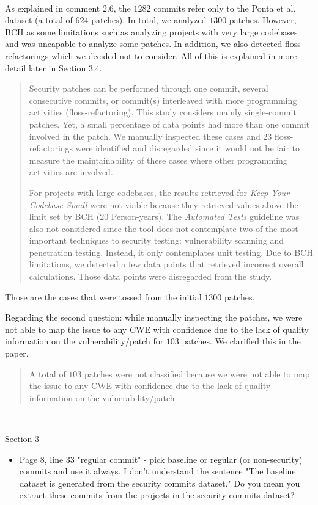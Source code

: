 \documentclass[11pt,fleqn]{article}
\newcommand{\eline}{\vspace*{.75\baselineskip}}
\newcommand{\Referee}[1]{\eline \noindent {\bf Reviewer comment #1:} \\}
\newcommand{\Us}{\eline \noindent {\bf Response:}\\}
\newenvironment{revcomment}[1][]
{\Referee{#1}\begin{rcomment}}
{\end{rcomment}}
\begin{document}
\Us As explained in comment $2.6$, the $1282$ commits refer only to the Ponta et al. dataset (a total of $624$ 
patches). In total, we analyzed $1300$ patches. However, BCH as some limitations such as
analyzing projects with very large codebases and was uncapable to analyze some patches. In addition,
we also detected floss-refactorings which we decided not to consider. All of this is explained
in more detail later in Section 3.4. 

\begin{quote}
    Security patches can be performed through one commit, 
several consecutive commits, or commit(s) interleaved with more 
programming activities (floss-refactoring). This study considers 
mainly single-commit patches. Yet, a small percentage of data points 
had more than one commit involved in the patch. We manually 
inspected these cases and $23$ floss-refactorings were identified 
and disregarded since it would not be fair to measure the 
maintainability of these cases where other programming activities 
are involved.

For projects with large codebases, the results retrieved for 
\emph{Keep Your Codebase Small} were not viable because they 
retrieved values above the limit set by BCH ($20$ Person-years). The 
\emph{Automated Tests} guideline was also not considered since the 
tool does not contemplate two of the most important techniques to 
security testing: vulnerability scanning and penetration testing. 
Instead, it only contemplates unit testing. Due to BCH limitations, 
we detected a few data points that retrieved incorrect overall 
calculations. Those data points were disregarded from the study.
\end{quote}

Those are the cases that were tossed from the initial $1300$ patches. 

Regarding the second question:
while manually inspecting the patches, we were not able to map
the issue to any CWE with confidence due to the lack of quality
information on the vulnerability/patch for $103$ patches. 
We clarified this in the paper.

\begin{quote}
    A total 
of $103$ patches were not classified because we were not able to map
the issue to any CWE with confidence due to the lack of quality
information on the vulnerability/patch.
\end{quote}

\begin{revcomment}[2.10]
    Section 3\\
    \begin{itemize}
        \item Page 8, line 33 "regular commit" - pick baseline or regular (or non-security) commits and use it always.  
        I don't understand the sentence "The baseline dataset is generated from the security commits dataset."   
        Do you mean you extract these commits from the projects in the security commits dataset?
    \end{itemize}
\end{revcomment}
\end{document}
